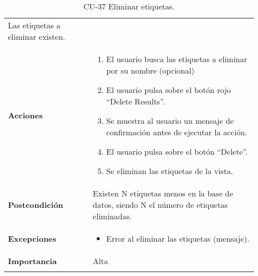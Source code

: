 \begin{longtable}[]{@{}ll@{}}
\begin{minipage}[t]{0.74\columnwidth}
Las etiquetas a eliminar existen.\strut
\end{minipage}\tabularnewline
\begin{minipage}[t]{0.21\columnwidth}\raggedright
\textbf{Acciones}\strut
\end{minipage} & \begin{minipage}[t]{0.74\columnwidth}\raggedright
\begin{enumerate}
\def\labelenumi{\arabic{enumi}.}
\tightlist
\item
  El usuario busca las etiquetas a eliminar por su nombre (opcional)
\item
  El usuario pulsa sobre el botón rojo ``Delete Results''.
\item
  Se muestra al usuario un mensaje de confirmación antes de ejecutar la
  acción.
\item
  El usuario pulsa sobre el botón ``Delete''.
\item
  Se eliminan las etiquetas de la vista.
\end{enumerate}\strut
\end{minipage}\tabularnewline
\begin{minipage}[t]{0.21\columnwidth}\raggedright
\textbf{Postcondición}\strut
\end{minipage} & \begin{minipage}[t]{0.74\columnwidth}\raggedright
Existen N etiquetas menos en la base de datos, siendo N el número de
etiquetas eliminadas.\strut
\end{minipage}\tabularnewline
\begin{minipage}[t]{0.21\columnwidth}\raggedright
\textbf{Excepciones}\strut
\end{minipage} & \begin{minipage}[t]{0.74\columnwidth}\raggedright
\begin{itemize}
\tightlist
\item
  Error al eliminar las etiquetas (mensaje).
\end{itemize}\strut
\end{minipage}\tabularnewline
\begin{minipage}[t]{0.21\columnwidth}\raggedright
\textbf{Importancia}\strut
\end{minipage} & \begin{minipage}[t]{0.74\columnwidth}\raggedright
Alta\strut
\end{minipage}\tabularnewline
\bottomrule
\caption{CU-37 Eliminar etiquetas.}
\end{longtable}

